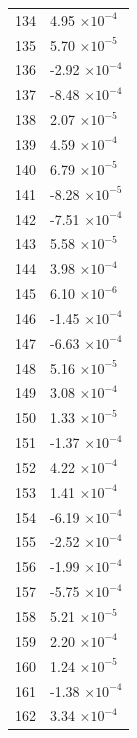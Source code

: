 \documentclass[a4paper,11pt]{article}
\begin{document}
\begin{center}
\begin{longtable}{|R{1.5cm}|R{2.5cm}|}
  134 &         4.95 $\times 10^{          -4}$ \\
  135 &         5.70 $\times 10^{          -5}$ \\
  136 &        -2.92 $\times 10^{          -4}$ \\
  137 &        -8.48 $\times 10^{          -4}$ \\
  138 &         2.07 $\times 10^{          -5}$ \\
  139 &         4.59 $\times 10^{          -4}$ \\
  140 &         6.79 $\times 10^{          -5}$ \\
  141 &        -8.28 $\times 10^{          -5}$ \\
  142 &        -7.51 $\times 10^{          -4}$ \\
  143 &         5.58 $\times 10^{          -5}$ \\
  144 &         3.98 $\times 10^{          -4}$ \\
  145 &         6.10 $\times 10^{          -6}$ \\
  146 &        -1.45 $\times 10^{          -4}$ \\
  147 &        -6.63 $\times 10^{          -4}$ \\
  148 &         5.16 $\times 10^{          -5}$ \\
  149 &         3.08 $\times 10^{          -4}$ \\
  150 &         1.33 $\times 10^{          -5}$ \\
  151 &        -1.37 $\times 10^{          -4}$ \\
  152 &         4.22 $\times 10^{          -4}$ \\
  153 &         1.41 $\times 10^{          -4}$ \\
  154 &        -6.19 $\times 10^{          -4}$ \\
  155 &        -2.52 $\times 10^{          -4}$ \\
  156 &        -1.99 $\times 10^{          -4}$ \\
  157 &        -5.75 $\times 10^{          -4}$ \\
  158 &         5.21 $\times 10^{          -5}$ \\
  159 &         2.20 $\times 10^{          -4}$ \\
  160 &         1.24 $\times 10^{          -5}$ \\
  161 &        -1.38 $\times 10^{          -4}$ \\
  162 &         3.34 $\times 10^{          -4}$ \\

\end{longtable}
\end{center}
\end{document}
